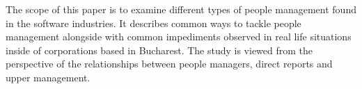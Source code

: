 The scope of this paper is to examine different types of people management found in the software industries. It describes common ways to tackle people management alongside with common impediments observed in real life situations inside of corporations based in Bucharest. The study is viewed from the perspective of the relationships between people managers, direct reports and upper management.
